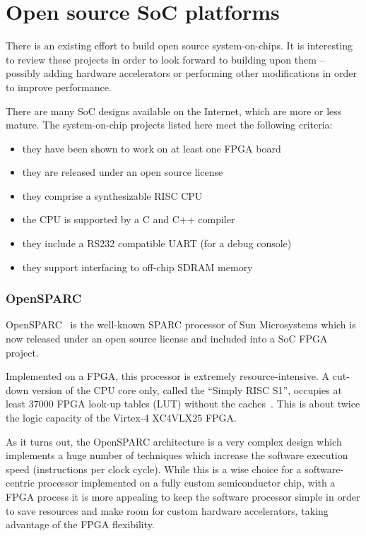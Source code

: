 \documentclass[a4paper,11pt]{kthesis}
\begin{document}
\section{Open source SoC platforms}
There is an existing effort to build open source system-on-chips. It is interesting to review these projects in order to look forward to building upon them -- possibly adding hardware accelerators or performing other modifications in order to improve performance.

There are many SoC designs available on the Internet, which are more or less mature. The system-on-chip projects listed here meet the following criteria:
\begin{itemize}
\item they have been shown to work on at least one FPGA board
\item they are released under an open source license
\item they comprise a synthesizable RISC CPU
\item the CPU is supported by a C and C++ compiler
\item they include a RS232 compatible UART (for a debug console)
\item they support interfacing to off-chip SDRAM memory
\end{itemize}

\subsubsection{OpenSPARC}
OpenSPARC~\cite{opensparc} is the well-known SPARC processor of Sun Microsystems which is now released under an open source license and included into a SoC FPGA project.

Implemented on a FPGA, this processor is extremely resource-intensive. A cut-down version of the CPU core only, called the ``Simply RISC S1'', occupies at least 37000 FPGA look-up tables (LUT) without the caches~\cite{simplyrisc}. This is about twice the logic capacity of the Virtex-4 XC4VLX25 FPGA.

As it turns out, the OpenSPARC architecture is a very complex design which implements a huge number of techniques which increase the software execution speed (instructions per clock cycle). While this is a wise choice for a software-centric processor implemented on a fully custom semiconductor chip, with a FPGA process it is more appealing to keep the software processor simple in order to save resources and make room for custom hardware accelerators, taking advantage of the FPGA flexibility.
\end{document}
